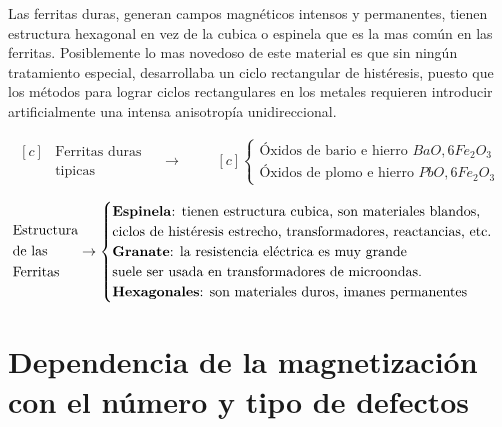 Las ferritas duras, generan campos magnéticos intensos y permanentes, tienen estructura hexagonal en vez de la cubica o espinela que es la mas común en las ferritas. Posiblemente lo mas novedoso de este material es que sin ningún tratamiento especial, desarrollaba un ciclo rectangular de histéresis, puesto que los métodos para lograr ciclos rectangulares en los metales requieren introducir artificialmente una intensa anisotropía unidireccional.

\begin{equation*}
	\begin{aligned}[c]
		&\text{Ferritas duras}\\
		&\text{tipicas}
	\end{aligned}
\quad\rightarrow\qquad
	\begin{aligned}[c]
				\begin{cases}
  				\text{Óxidos de bario e hierro }BaO, 6Fe_{2}O_{3}\\
 				\text{Óxidos de plomo e hierro }PbO, 6Fe_{2}O_{3} 
    			\end{cases}
	\end{aligned}
\end{equation*}



\begin{equation*}
	\begin{aligned}[c]
		&\text{Estructura}\\
		&\text{de las}\\
		&\text{Ferritas}
	\end{aligned}
	 \rightarrow
				\begin{cases}
  				\text{\textbf{Espinela}: tienen estructura cubica, son materiales blandos,} \\
  				\text{ciclos de histéresis estrecho, transformadores, reactancias, etc.}\\
 				\text{\textbf{Granate}: la resistencia eléctrica es muy grande} \\
				\text{suele ser usada en transformadores de microondas.}\\
  				\text{\textbf{Hexagonales}: son materiales duros, imanes permanentes}
    			\end{cases}
\end{equation*}


\section{Dependencia de la magnetización con el número y tipo de defectos}

